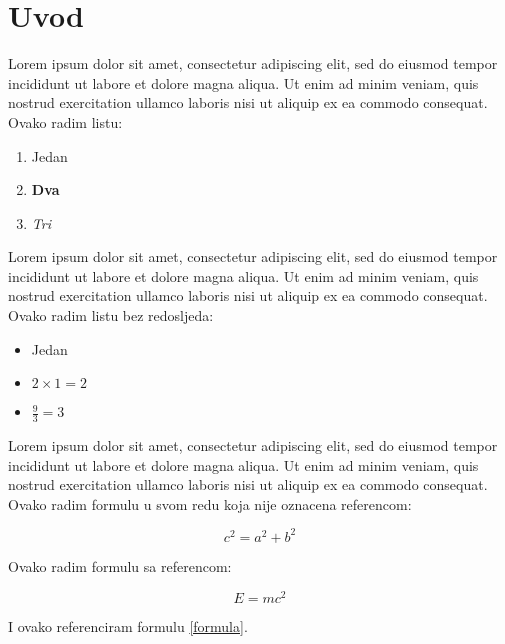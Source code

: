 \section{Uvod}

Lorem ipsum dolor sit amet, consectetur adipiscing elit, sed do eiusmod tempor incididunt ut labore et dolore magna aliqua. Ut enim ad minim veniam, quis nostrud exercitation ullamco laboris nisi ut aliquip ex ea commodo consequat. Ovako radim listu:
\begin{enumerate}
    \item Jedan
    \item \textbf{Dva}
    \item \textit{Tri}
\end{enumerate}

Lorem ipsum dolor sit amet, consectetur adipiscing elit, sed do eiusmod tempor incididunt ut labore et dolore magna aliqua. Ut enim ad minim veniam, quis nostrud exercitation ullamco laboris nisi ut aliquip ex ea commodo consequat. Ovako radim listu bez redosljeda:
\begin{itemize}
    \item Jedan
    \item $2 \times 1 = 2$
    \item $\frac{9}{3} = 3$
\end{itemize}

Lorem ipsum dolor sit amet, consectetur adipiscing elit, sed do eiusmod tempor incididunt ut labore et dolore magna aliqua. Ut enim ad minim veniam, quis nostrud exercitation ullamco laboris nisi ut aliquip ex ea commodo consequat. Ovako radim formulu u svom redu koja nije oznacena referencom:

\[ c^2 = a^2 + b^2 \]

Ovako radim formulu sa referencom:

\begin{equation}\label{formula}
    E = m c^2
\end{equation}

I ovako referenciram formulu \ref{formula}.